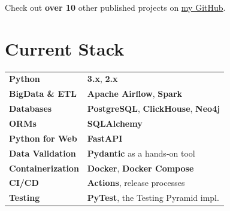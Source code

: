 \documentclass[a4paper,11pt]{article}
\newcommand{\MySkip}{
\vskip10pt
}
\begin{document}
\begin{adjustbox}{valign=t}
\begin{minipage}{0.65\textwidth}
\begin{flushleft}
\MySkip

Check out \textbf{over 10} other published projects on \href{https://github.com/realkarych}{my GitHub}. \\
\end{flushleft}

\section*{Current Stack}
\begin{tabular}{@{}p{5cm}p{9cm}@{}}
    \textbf{Python}                      & \textbf{3.x}, \textbf{2.x} \\
    \textbf{BigData \& ETL}              & \textbf{Apache Airflow}, \textbf{Spark} \\
    \textbf{Databases}                   & \textbf{PostgreSQL}, \textbf{ClickHouse}, \textbf{Neo4j} \\
    \textbf{ORMs}                        & \textbf{SQLAlchemy} \\
    \textbf{Python for Web}              & \textbf{FastAPI} \\
    \textbf{Data Validation}             & \textbf{Pydantic} as a hands-on tool \\
    \textbf{Containerization}            & \textbf{Docker}, \textbf{Docker Compose} \\
    \textbf{CI/CD}                       & \textbf{Actions}, release processes \\
    \textbf{Testing}                     & \textbf{PyTest}, the Testing Pyramid impl. \\
\end{tabular}
\end{minipage}
\end{adjustbox}
\end{document}
